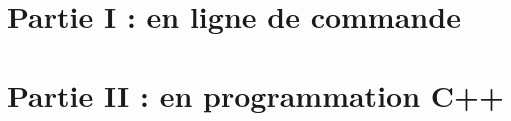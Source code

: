 \documentclass[a4paper, 11pt]{article}
\begin{document}
	\maketitle
	\section{Partie I : en ligne de commande}
	\subsection{}
	\subsection{}
	\subsection{}
	\subsection{}
	\section{Partie II : en programmation C++}
	\subsection{}
	\subsection{}
	\subsection{}
	\subsection{}
	\subsection{}
\end{document}

